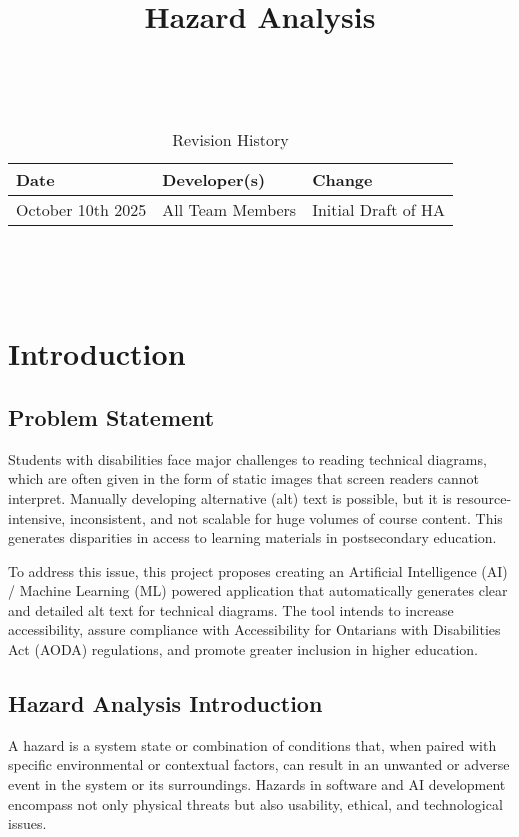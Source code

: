\documentclass{article}
\title{Hazard Analysis\\\progname}
\author{\authname}
\date{}
\begin{document}
\maketitle
\thispagestyle{empty}

~\newpage


\begin{table}[hp]
  \caption{Revision History} \label{TblRevisionHistory}
  \begin{tabularx}{\textwidth}{llX}
    \toprule
    \textbf{Date} & \textbf{Developer(s)} & \textbf{Change}\\
    \midrule
    October 10th 2025 & All Team Members & Initial Draft of HA \\
    \bottomrule
  \end{tabularx}
\end{table}

~\newpage

\tableofcontents

~\newpage



\section{Introduction}

\subsection{Problem Statement}
Students with disabilities face major challenges to reading technical diagrams, which are often given in the form of static images that screen readers cannot interpret. Manually developing alternative (alt) text is possible, but it is resource-intensive, inconsistent, and not scalable for huge volumes of course content. This generates disparities in access to learning materials in postsecondary education.

To address this issue, this project proposes creating an Artificial Intelligence (AI) / Machine Learning (ML) powered application that automatically generates clear and detailed alt text for technical diagrams. The tool intends to increase accessibility, assure compliance with Accessibility for Ontarians with Disabilities Act (AODA) regulations, and promote greater inclusion in higher education.

\subsection{Hazard Analysis Introduction}
A hazard is a system state or combination of conditions that, when paired with specific environmental or contextual factors, can result in an unwanted or adverse event in the system or its surroundings. Hazards in software and AI development encompass not only physical threats but also usability, ethical, and technological issues.
\end{document}
